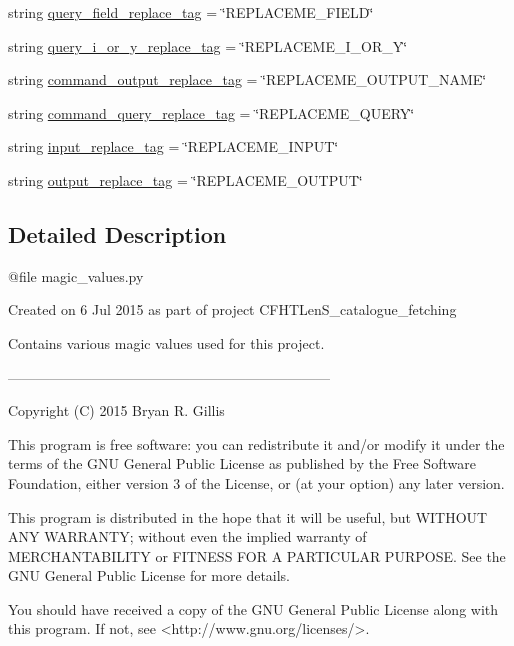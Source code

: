 \begin{DoxyCompactItemize}
\item 
string \hyperlink{namespaceCFHTLenS__Mag__fetching__data_1_1magic__values_a056a77ba60ed7310cca0c428e6fa7aca}{query\+\_\+field\+\_\+replace\+\_\+tag} = \char`\"{}R\+E\+P\+L\+A\+C\+E\+M\+E\+\_\+\+F\+I\+E\+L\+D\char`\"{}
\item 
string \hyperlink{namespaceCFHTLenS__Mag__fetching__data_1_1magic__values_ad7132d2537c4635bcbc48077bf4b8c63}{query\+\_\+i\+\_\+or\+\_\+y\+\_\+replace\+\_\+tag} = \char`\"{}R\+E\+P\+L\+A\+C\+E\+M\+E\+\_\+\+I\+\_\+\+O\+R\+\_\+\+Y\char`\"{}
\item 
string \hyperlink{namespaceCFHTLenS__Mag__fetching__data_1_1magic__values_aef60f791ed4f6f621b7dbe1762acd691}{command\+\_\+output\+\_\+replace\+\_\+tag} = \char`\"{}R\+E\+P\+L\+A\+C\+E\+M\+E\+\_\+\+O\+U\+T\+P\+U\+T\+\_\+\+N\+A\+M\+E\char`\"{}
\item 
string \hyperlink{namespaceCFHTLenS__Mag__fetching__data_1_1magic__values_ab1baa78799dd76e5885876c52eb169fb}{command\+\_\+query\+\_\+replace\+\_\+tag} = \char`\"{}R\+E\+P\+L\+A\+C\+E\+M\+E\+\_\+\+Q\+U\+E\+R\+Y\char`\"{}
\item 
string \hyperlink{namespaceCFHTLenS__Mag__fetching__data_1_1magic__values_afe4cede121b216e23e2f68fdff89fe0d}{input\+\_\+replace\+\_\+tag} = \char`\"{}R\+E\+P\+L\+A\+C\+E\+M\+E\+\_\+\+I\+N\+P\+U\+T\char`\"{}
\item 
string \hyperlink{namespaceCFHTLenS__Mag__fetching__data_1_1magic__values_a6c3644e92e83c59f6fd9c5087b0de75a}{output\+\_\+replace\+\_\+tag} = \char`\"{}R\+E\+P\+L\+A\+C\+E\+M\+E\+\_\+\+O\+U\+T\+P\+U\+T\char`\"{}
\end{DoxyCompactItemize}


\subsection{Detailed Description}
\begin{DoxyVerb}@file magic_values.py

Created on 6 Jul 2015 as part of project CFHTLenS_catalogue_fetching

Contains various magic values used for this project.

---------------------------------------------------------------------

Copyright (C) 2015  Bryan R. Gillis

This program is free software: you can redistribute it and/or modify
 it under the terms of the GNU General Public License as published by
 the Free Software Foundation, either version 3 of the License, or
 (at your option) any later version.

 This program is distributed in the hope that it will be useful,
 but WITHOUT ANY WARRANTY; without even the implied warranty of
 MERCHANTABILITY or FITNESS FOR A PARTICULAR PURPOSE.  See the
 GNU General Public License for more details.

You should have received a copy of the GNU General Public License
along with this program.  If not, see <http://www.gnu.org/licenses/>.\end{DoxyVerb}
 

